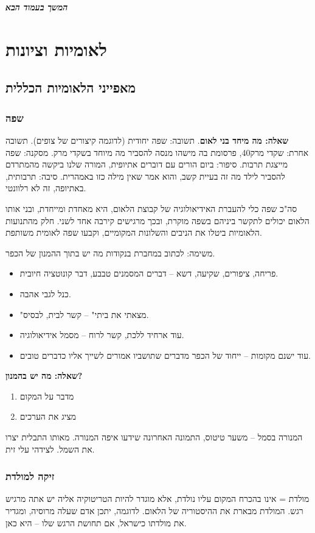 \documentclass[a4paper]{book}
\newcommand\npchapter[1] {\npage\chapter{#1}\thispagestyle{empty}\newpage}
\newcommand\npage {\vfil {\hfil \textbf{\textit{המשך בעמוד הבא}}} \hfil \vfil \pagebreak}
\begin{document}
	\npchapter{לאומיות וציונות}
	
	\section{מאפייני הלאומיות הכללית}
	\subsection{שפה}
	\textbf{שאלה: מה מיחד בני לאום}. תשובה: שפה יחודית (לדוגמה קיצורים של צופים). תשובה אחרת: שקדי מרק40, פרסומת בה מישהו מנסה להסביר מה מיוחד בשקדי מרק. מסקנה: שפה מייצגת תרבות. סיפור: ביום הורים עם דוברים אתיופית, המורה שלנו ביקשה מהמתרדם להסביר לילד מה זה בעיית קשב, והוא אמר שאין מילה כזו באמהרית. סיבה: תרבותית, באתיופה, זה לא רלוונטי. 
	
	סה"כ שפה כלי להעברת האידיאולוגיה של קבוצת הלאום, היא מאחדת ומייחדת, ובני אותו הלאום יכולים לתקשר ביניהם בשפה מוקרת, ובכך מרגישים קירבה אחד לשני. חלק מהתנועות הלאומיות ביטלו את הניבים והשלונות המקומיים, וקבעו שפה לאומית משותפת. 
	
	משימה: לכתוב במחברת בנקודות מה יש בתוך ההמנון של הכפר. 
	\begin{itemize}
		\item פריחה, ציפורים, שקיעה, דשא – דברים המסמנים טבבע, דבר קונוטציה חיובית. 
		\item כנל לגבי אהבה. 
		\item "מצאתי את ביתי" – קשר לבית, לבסיס. 
		\item עוד ארחיד ללכת, קשר לרוח – מסמל אידיאולוגיה. 
		\item עוד ישנם מקומות – ייחוד של הכפר מדברים שתושביו אמורים לשייך אליו כדברים טובים. 
	\end{itemize}
	
	\textbf{שאלה: מה יש בהמנון?}
	
	\begin{enumerate}
		\item מדבר על המקום
		\item מציג את הערכים
	\end{enumerate}
	
	המנורה בסמל – משער טיטוס, התמונה האחרונה שידעו איפה המנורה. מאותו התבלית יצרו את השמל. לצידהי עלי זית. 
	
	\subsection{זיקה למולדת}
	מולדת = אינו בהכרח המקום עליו נולדת, אלא מוגדר להיות הטריטוקיה אליה יש אתה מרגיש רגש. המולדת מבארת את ההיסטוריה של הלאום. לדוגמה, יתכן אדם שעלה מרוסיה, ומגדיר את מולדתו כישראל, אם תחושת הרגש שלו – היא כאן. 
	
\end{document}

